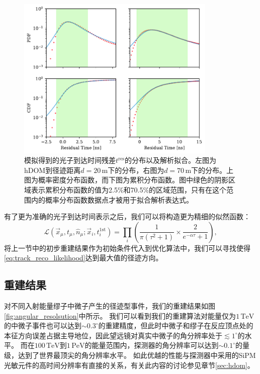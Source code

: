 \begin{figure}[!htb]%
    \centering
    \includegraphics[width=0.85\textwidth]{img/residual_time_distribution.pdf}
    \caption{模拟得到的光子到达时间残差$t^\mathrm{res}$的分布以及解析拟合。左图为hDOM到径迹距离$d = 20 \,\mathrm{m}$下的分布，右图为$d = 70 \,\mathrm{m}$下的分布。上图为概率密度分布函数，而下图为累积分布函数。图中绿色的阴影区域表示累积分布函数的值为2.5\%和70.5\%的区域范围，只有在这个范围内的概率分布函数数据点才被用于拟合解析表达式。}
    \label{fig:residual_time_distribution}
\end{figure}

有了更为准确的光子到达时间表示之后，我们可以将构造更为精细的似然函数：
\begin{equation}
    \mathcal{L}(\vec{x}_\mu, t_\mu, \hat{n}_\mu; \vec{x}_i, t_i^\mathrm{1st}) = 
    \prod_i \left( \frac{1}{\pi (\tau^2+1)} \times \frac{2}{e^{-\alpha \tau} + 1} \right),
    \label{eq:track_reco_likelihood}
\end{equation}
将上一节中的初步重建结果作为初始条件代入到优化算法中，我们可以寻找使得\ref{eq:track_reco_likelihood}达到最大值的径迹方向。


\subsection{重建结果}

对不同入射能量缪子中微子产生的径迹型事件，我们的重建结果如图\ref{fig:angular_resolsution}中所示。
我们可以看到我们的重建算法对能量仅为$1\,\mathrm{TeV}$的中微子事件也可以达到$\sim 0.3^\circ$的重建精度，但此时中微子和缪子在反应顶点处的本征方向误差占据主导地位，因此望远镜对真实中微子的角分辨率处于$\lesssim 1^\circ$的水平。
而在$100\,\mathrm{TeV}$到$1\,\mathrm{PeV}$的能量范围内，探测器的角分辨率可以达到$\sim 0.1^\circ$的量级，达到了世界最顶尖的角分辨率水平。
如此优越的性能与探测器中采用的SiPM光敏元件的高时间分辨率有直接的关系，有关此内容的讨论参见章节\ref{sec:hdom}。


